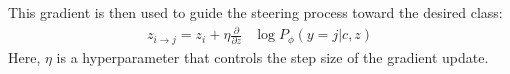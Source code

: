 


This gradient is then used to guide the steering process toward the desired class:
\begin{align}
z_{i \rightarrow j} = z_{i} + \eta\frac{\partial}{\partial z} & \log P_{\phi}(y = j|c, z)\label{eq:steering}
\end{align}
Here, $\eta$ is a hyperparameter that controls the step size of the gradient update.

\begin{comment}
\begin{figure*}[t]
  \texttt{[image: latex/figures/traj.pdf]}
  \caption{Comparison of Bloom's taxonomy based level transformations showing UMAP feature space (left) and density landscape (right) for different transitions. (Up) Feature trajectory from ``remember'' to ``create'' showing diagonal density pattern indicating hierarchical progression. (Down) Feature trajectory from ``remember'' to ``analyze'' showing horizontal density concentration.}
  \label{fig:traj}
\end{figure*}
\end{comment}











